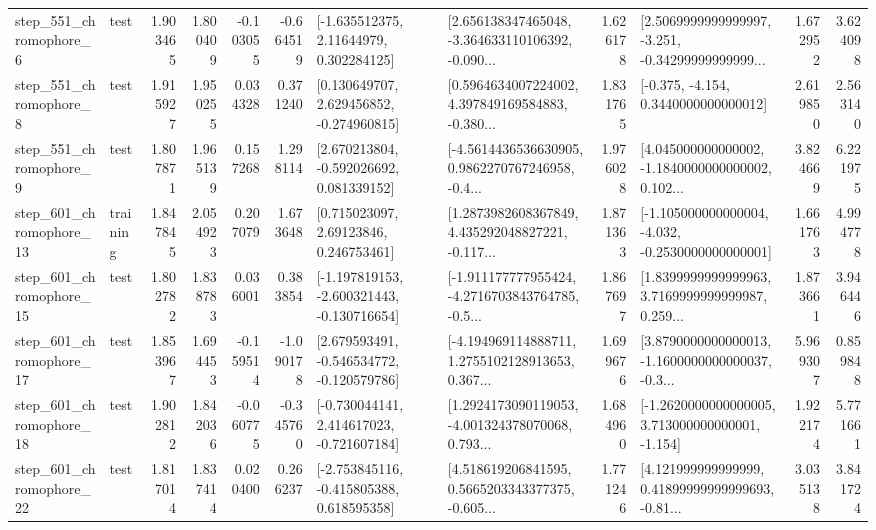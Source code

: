 \begin{tabular}{llrrrrllrlrr}
   step\_551\_chromophore\_6 &      test &      1.903465 &    1.800409 &     -0.103055 & -0.664519 &     [-1.635512375, 2.11644979, 0.302284125] &  [2.656138347465048, -3.364633110106392, -0.090... &       1.626178 &  [2.5069999999999997, -3.251, -0.34299999999999... &            1.672952 &          3.624098 \\
   step\_551\_chromophore\_8 &      test &      1.915927 &    1.950255 &      0.034328 &  0.371240 &    [0.130649707, 2.629456852, -0.274960815] &  [0.5964634007224002, 4.397849169584883, -0.380... &       1.831765 &               [-0.375, -4.154, 0.3440000000000012] &            2.619850 &          2.563140 \\
   step\_551\_chromophore\_9 &      test &      1.807871 &    1.965139 &      0.157268 &  1.298114 &    [2.670213804, -0.592026692, 0.081339152] &  [-4.5614436536630905, 0.9862270767246958, -0.4... &       1.976028 &  [4.045000000000002, -1.1840000000000002, 0.102... &            3.824669 &          6.221975 \\
  step\_601\_chromophore\_13 &  training &      1.847845 &    2.054923 &      0.207079 &  1.673648 &      [0.715023097, 2.69123846, 0.246753461] &  [1.2873982608367849, 4.435292048827221, -0.117... &       1.871363 &  [-1.105000000000004, -4.032, -0.2530000000000001] &            1.661763 &          4.994778 \\
  step\_601\_chromophore\_15 &      test &      1.802782 &    1.838783 &      0.036001 &  0.383854 &  [-1.197819153, -2.600321443, -0.130716654] &  [-1.911177777955424, -4.2716703843764785, -0.5... &       1.867697 &  [1.8399999999999963, 3.7169999999999987, 0.259... &            1.873661 &          3.946446 \\
  step\_601\_chromophore\_17 &      test &      1.853967 &    1.694453 &     -0.159514 & -1.090178 &   [2.679593491, -0.546534772, -0.120579786] &  [-4.194969114888711, 1.2755102128913653, 0.367... &       1.699676 &  [3.8790000000000013, -1.1600000000000037, -0.3... &            5.969307 &          0.859848 \\
  step\_601\_chromophore\_18 &      test &      1.902812 &    1.842036 &     -0.060775 & -0.345760 &   [-0.730044141, 2.414617023, -0.721607184] &  [1.2924173090119053, -4.001324378070068, 0.793... &       1.684960 &   [-1.2620000000000005, 3.713000000000001, -1.154] &            1.922174 &          5.771661 \\
  step\_601\_chromophore\_22 &      test &      1.817014 &    1.837414 &      0.020400 &  0.266237 &   [-2.753845116, -0.415805388, 0.618595358] &  [4.518619206841595, 0.5665203343377375, -0.605... &       1.771246 &  [4.121999999999999, 0.41899999999999693, -0.81... &            3.035138 &          3.841724 \\

\end{tabular}
